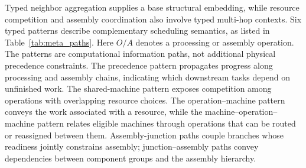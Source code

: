 
Typed neighbor aggregation supplies a base structural embedding, while resource competition and
assembly coordination also involve typed multi-hop contexts. Six typed patterns describe complementary scheduling semantics, as listed in Table~\ref{tab:meta_paths}.
Here $O/A$ denotes a processing or assembly operation. The patterns are computational information paths,
not additional physical precedence constraints. The precedence pattern propagates progress along processing and assembly chains, indicating
which downstream tasks depend on unfinished work. The shared-machine pattern exposes competition
among operations with overlapping resource choices. The operation--machine pattern conveys the
work associated with a resource, while the machine--operation--machine pattern relates eligible
machines through operations that can be routed or reassigned between them. Assembly-junction
paths couple branches whose readiness jointly constrains assembly; junction--assembly paths
convey dependencies between component groups and the assembly hierarchy.


